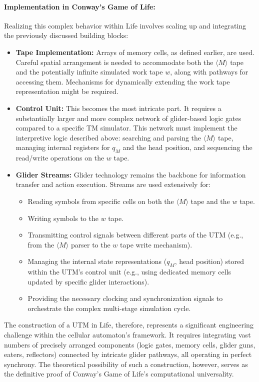 \documentclass{article}
\theoremstyle{definition}
\theoremstyle{plain}
\theoremstyle{plain}
\begin{document}
\paragraph{Implementation in Conway's Game of Life:}
Realizing this complex behavior within Life involves scaling up and integrating the previously discussed building blocks:

\begin{itemize}
  \item \textbf{Tape Implementation:} Arrays of memory cells, as defined earlier, are used. Careful spatial arrangement is needed to accommodate both the $\langle M \rangle$ tape and the potentially infinite simulated work tape $w$, along with pathways for accessing them. Mechanisms for dynamically extending the work tape representation might be required.
  \item \textbf{Control Unit:} This becomes the most intricate part. It requires a substantially larger and more complex network of glider-based logic gates compared to a specific TM simulator. This network must implement the interpretive logic described above: searching and parsing the $\langle M \rangle$ tape, managing internal registers for $q_M$ and the head position, and sequencing the read/write operations on the $w$ tape.
  \item \textbf{Glider Streams:} Glider technology remains the backbone for information transfer and action execution. Streams are used extensively for:
    \begin{itemize}
      \item Reading symbols from specific cells on both the $\langle M \rangle$ tape and the $w$ tape.
      \item Writing symbols to the $w$ tape.
      \item Transmitting control signals between different parts of the UTM (e.g., from the $\langle M \rangle$ parser to the $w$ tape write mechanism).
      \item Managing the internal state representations ($q_M$, head position) stored within the UTM's control unit (e.g., using dedicated memory cells updated by specific glider interactions).
      \item Providing the necessary clocking and synchronization signals to orchestrate the complex multi-stage simulation cycle.
    \end{itemize}
\end{itemize}

The construction of a UTM in Life, therefore, represents a significant engineering challenge within the cellular automaton's framework. It requires integrating vast numbers of precisely arranged components (logic gates, memory cells, glider guns, eaters, reflectors) connected by intricate glider pathways, all operating in perfect synchrony. The theoretical possibility of such a construction, however, serves as the definitive proof of Conway's Game of Life's computational universality.
\end{document}
